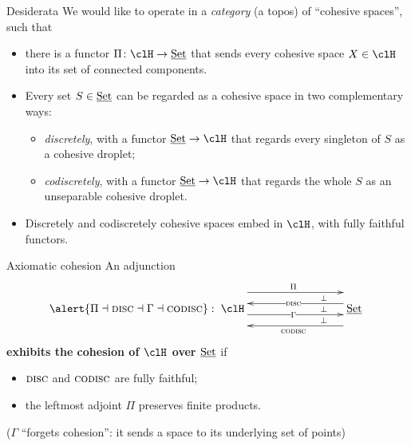 \documentclass[presentation,handout]{beamer}
\begin{document}
\begin{frame}{Desiderata}
  \onslide<+->
  We would like to operate in a \emph{category} (a \alert{topos}) of ``cohesive spaces'', such that
  \begin{itemize}
    \item<+-> there is a functor $\Pi \colon \clH \to \Set$ that sends every cohesive space $X\in\clH$ into its set of \alert{connected components}.
    \item<+-> Every set $S\in\underline{\text{Set}}$ can be regarded as a cohesive space in two complementary ways:
    \begin{itemize}
      \item<+-> \emph{discretely}, with a functor $\Set\to\clH$ that regards every singleton of $S$ as a cohesive droplet;
      \item<+-> \emph{codiscretely}, with a functor $\Set\to\clH$ that regards the whole $S$ as an unseparable cohesive droplet.
    \end{itemize}
    \item<+-> Discretely and codiscretely cohesive spaces embed  in $\clH$, with fully faithful functors.%
  \end{itemize}
\end{frame}
%
%
%
%
%
%
%
\begin{frame}{Axiomatic cohesion}
  \onslide<+->
  An adjunction
  \[
  \alert{\Pi\dashv \disc\dashv\Gamma\dashv \codisc} :
  \xymatrix@C=3cm{
  \clH \ar@{}[r]|(.75)\perp
  \ar@{}@<10pt>[r]|(.75)\perp
  \ar@{}@<-10pt>[r]|(.75)\perp
  \ar@<15pt>[r]^{\Pi}
  \ar@<-5pt>[r]|\Gamma
  &
  \ar@<-5pt>[l]|{\disc}
  \ar@<15pt>[l]^{\codisc}
  \Set
  }
  \]
  \textbf{exhibits the cohesion of $\clH$ over $\underline{\text{Set}}$} if
  \begin{itemize}
    \item<+-> $\textsc{disc}$ and $\textsc{codisc}$ are fully faithful;
    \item<+-> the leftmost adjoint $\Pi$ preserves finite products.
  \end{itemize}
  \onslide<+->
  ($\Gamma$ ``forgets cohesion'': it sends a space to its underlying set of points)
\end{frame}
%
%
%
%
%
%
%
\end{document}
